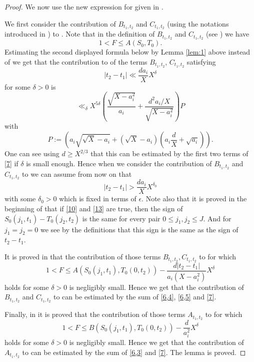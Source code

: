 \documentclass[12pt]{amsart}
\theoremstyle{definition}
\numberwithin{equation}{section}
\begin{document}
\begin{proof}
We now use the new expression \cite[(6.45)]{Biro} for \cite[(6.7)]{Biro}
given in \cite[Subsection 6.6]{Biro}.

We first consider the contribution of $B_{t_1,t_2}$ and $C_{t_1,t_
2}$
(using the notations introduced in \cite[Subsection
6.6]{Biro}) to \cite[(6.7)]{Biro}. Note that in the definition
of  $B_{t_1,t_2}$ and $C_{t_1,t_2}$ (see \cite[(6.47) and (6.48)]{Biro}) we
have
\[1<F\le A\left(S_0,T_0\right).\]
Estimating the second displayed formula below \cite[(6.49)]{Biro} by Lemma \ref{lem:1} above instead of
\cite[(3.20)]{Biro} we get that the contribution to
\cite[(6.7)]{Biro} of the terms $B_{t_1,t_2}$, $C_{t_1,t_2}$ satisfying
\[\left|t_2-t_1\right|\ll\frac {da_i}XX^{\delta}\]
for some $\delta >0$ is
\[\ll_{\delta}X^{5\delta}\left(\frac {\sqrt {X-a^2_i}}{a_i}+\frac {
d^2a_i/X}{\sqrt {X-a^2_i}}\right)P\]
with
\[P:=\left(a_i\sqrt {\sqrt {X}-a_i}+\left(\sqrt {X}-a_i\right)\left
(a_i\frac dX+\sqrt {a_i}\right)\right).\]
One can see using $d\ge X^{2/3}$ that this can be estimated by the
first two terms of \eqref{7} if $\delta$ is small enough. Hence
when we consider the contribution of $B_{t_1,t_2}$ and $C_{t_1,t_
2}$ to
\cite[(6.7)]{Biro} we can assume from now on that
\begin{equation}\left|t_2-t_1\right|>\frac {da_i}XX^{\delta_0}\label{13}\end{equation}
with some $\delta_0>0$ which is fixed in terms of $\epsilon$. Note also
that it is proved in the beginning of \cite[Subsection
6.4]{Biro} that if \eqref{10} and \eqref{13} are true, then the sign of
$S_0\left(j_1,t_1\right)-T_0\left(j_2,t_2\right)$ is the same for every pair
$0\le j_1,j_2\le J$. And for $j_1=j_2=0$ we see by the
definitions that this sign is the same as the sign of
$t_2-t_1$.

It is proved in \cite[Subsection 6.7]{Biro} that the contribution of those terms
$B_{t_1,t_2}$$,C_{t_1,t_2}$ to \cite[(6.7)]{Biro} for which
\[1<F\le A\left(S_0\left(j_1,t_1\right),T_0\left(0,t_2\right)\right
)-\frac {d\left|t_2-t_1\right|}{a_i\left(X-a_i^2\right)}X^{\delta}\]
holds for some $\delta >0$ is negligibly small. Hence we get
that the contribution of $B_{t_1,t_2}$ and $C_{t_1,t_2}$ to
\cite[(6.7)]{Biro} can be estimated by the sum of
\eqref{6,4}, \eqref{6,5} and \eqref{7}.

Finally, in \cite[Subsection 6.8]{Biro} it is proved that the contribution of those terms
$A_{t_1,t_2}$ to \cite[(6.7)]{Biro} for which
\[1<F\le B\left(S_0\left(j_1,t_1\right),T_0\left(0,t_2\right)\right
)-\frac d{a_i^2}X^{\delta}\]
holds for some $\delta >0$ is negligibly small.
Hence we get that the contribution of $A_{t_1,t_2}$ to
\cite[(6.7)]{Biro} can be estimated by the sum of
\eqref{6,3} and \eqref{7}. The lemma is proved.

\end{proof}
\end{document}
